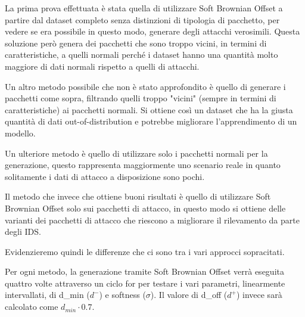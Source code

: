 \begin{table}\centering\setlength\tabcolsep{3.5pt}\renewcommand{}
  \noindent{}%
\end{table}



La prima prova effettuata è stata quella di utilizzare Soft Brownian Offset a partire dal dataset completo senza distinzioni di tipologia di pacchetto, per vedere se era possibile in questo modo, generare degli attacchi verosimili. Questa soluzione però genera dei pacchetti che sono troppo vicini, in termini di caratteristiche, a quelli normali perché i dataset hanno una quantità molto maggiore di dati normali rispetto a quelli di attacchi.

Un altro metodo possibile che non è stato approfondito è quello di generare i pacchetti come sopra, filtrando quelli troppo "vicini" (sempre in termini di caratteristiche) ai pacchetti normali. Si ottiene così un dataset che ha la giusta quantità di dati out-of-distribution e potrebbe migliorare l'apprendimento di un modello.

Un ulteriore metodo è quello di utilizzare solo i pacchetti normali per la generazione, questo rappresenta maggiormente uno scenario reale in quanto solitamente i dati di attacco a disposizione sono pochi.

Il metodo che invece che  ottiene buoni risultati è quello di utilizzare Soft Brownian Offset solo sui pacchetti di attacco, in questo modo si ottiene delle varianti dei pacchetti di attacco che riescono a migliorare il rilevamento da parte degli IDS.

Evidenzieremo quindi le differenze che ci sono tra i vari approcci sopracitati.

Per ogni metodo, la generazione tramite Soft Brownian Offset verrà eseguita quattro volte attraverso un ciclo for per testare i vari parametri, linearmente intervallati, di d\_min ($d^{-}$) e softness ($\sigma$). Il valore di d\_off ($d^{+}$) invece sarà calcolato come $d_{min} \cdot 0.7$.

